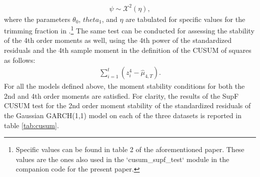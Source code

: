 \documentclass{article} %
\begin{document}
	\begin{align}
		\psi \sim \mathcal{X}^2(\eta),
	\end{align}
	where the parameters $\theta_0$, $theta_1$, and $\eta$ are tabulated for specific values for the trimming fraction in \textcite{HANSEN_CUSUM}.\footnote{Specific values can be found in table 2 of the aforementioned paper. These values are the ones also used in the `cusum\_supf\_test` module in the companion code for the present paper.} The same test can be conducted for assessing the stability of the 4th order moments as well, using the 4th power of the standardized residuals and the 4th sample moment in the definition of the CUSUM of squares as follows:
	\begin{align}
		\sum_{i=1}^t (z_i^4 - \hat{\mu}_{4,T}).
	\end{align}
	For all the models defined above, the moment stability conditions for both the 2nd and 4th order moments are satisfied. For clarity, the results of the SupF CUSUM test for the 2nd order moment stability of the standardized residuals of the Gaussian GARCH(1,1) model on each of the three datasets is reported in table \ref{tab:cusum}.
	
\end{document}
